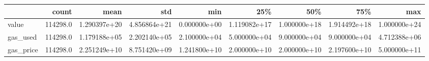 \begin{tabular}{lrrrrrrrr}
\toprule
{} &     count &          mean &           std &           min &           25\% &           50\% &           75\% &           max \\
\midrule
value     &  114298.0 &  1.290397e+20 &  4.856864e+21 &  0.000000e+00 &  1.119082e+17 &  1.000000e+18 &  1.914492e+18 &  1.000000e+24 \\
gas\_used  &  114298.0 &  1.179188e+05 &  2.202140e+05 &  2.100000e+04 &  5.000000e+04 &  9.000000e+04 &  9.000000e+04 &  4.712388e+06 \\
gas\_price &  114298.0 &  2.251249e+10 &  8.751420e+09 &  1.241800e+10 &  2.000000e+10 &  2.000000e+10 &  2.197600e+10 &  5.000000e+11 \\
\bottomrule
\end{tabular}

